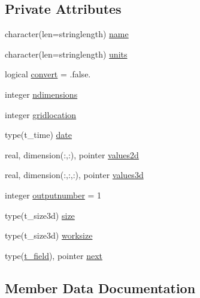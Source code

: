 \subsection*{Private Attributes}
\begin{DoxyCompactItemize}
\item 
character(len=stringlength) \mbox{\hyperlink{structmoduleera40format_1_1t__field_aa9d07364286508770a4e3e4270bce08e}{name}}
\item 
character(len=stringlength) \mbox{\hyperlink{structmoduleera40format_1_1t__field_a60076b9ea5535217f2e4f611d8d5f42d}{units}}
\item 
logical \mbox{\hyperlink{structmoduleera40format_1_1t__field_ab1e0d583922c490b91b674bd3a1855ca}{convert}} = .false.
\item 
integer \mbox{\hyperlink{structmoduleera40format_1_1t__field_ac8f22a569e76bba8a06a8b7479f20559}{ndimensions}}
\item 
integer \mbox{\hyperlink{structmoduleera40format_1_1t__field_a92c47564d4b871c62c01d6ed97fe78ee}{gridlocation}}
\item 
type(t\+\_\+time) \mbox{\hyperlink{structmoduleera40format_1_1t__field_acad86c7ecd08448a3a8cf7317d74eb38}{date}}
\item 
real, dimension(\+:,\+:), pointer \mbox{\hyperlink{structmoduleera40format_1_1t__field_aefb40a18d543074bb61ede9dab92ec7d}{values2d}}
\item 
real, dimension(\+:,\+:,\+:), pointer \mbox{\hyperlink{structmoduleera40format_1_1t__field_ae8cd3a3675a16ad320db33330b8e7e64}{values3d}}
\item 
integer \mbox{\hyperlink{structmoduleera40format_1_1t__field_a3a8002a025348ee6cfc7b64ebd8eab63}{outputnumber}} = 1
\item 
type(t\+\_\+size3d) \mbox{\hyperlink{structmoduleera40format_1_1t__field_a670485fbb295a8f5ceb1a9d208b939d2}{size}}
\item 
type(t\+\_\+size3d) \mbox{\hyperlink{structmoduleera40format_1_1t__field_ae55cb1e0e1938db3ed44e6ccff526f33}{worksize}}
\item 
type(\mbox{\hyperlink{structmoduleera40format_1_1t__field}{t\+\_\+field}}), pointer \mbox{\hyperlink{structmoduleera40format_1_1t__field_a9df32ed9cae76868ca12822569f06e90}{next}}
\end{DoxyCompactItemize}


\subsection{Member Data Documentation}
\mbox{\label{structmoduleera40format_1_1t__field_ab1e0d583922c490b91b674bd3a1855ca}} 
